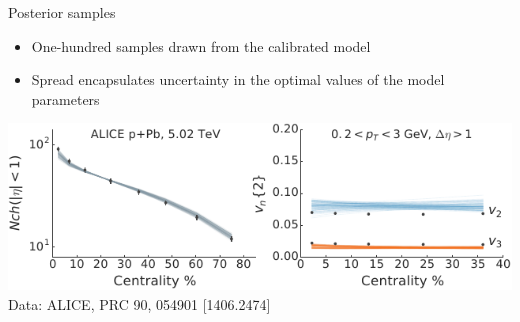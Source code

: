 \documentclass[aspectratio=43]{beamer}
\theoremstyle{definition}
\begin{document}
\begin{frame}[t]{Posterior samples}
  \bigskip
  \begin{itemize}
    \item One-hundred samples drawn from the calibrated model \\[1ex]
    \item Spread encapsulates uncertainty in the optimal values of the model parameters
  \end{itemize}
  \bigskip
  \includegraphics[width=\textwidth]{observables_samples} \\[1ex]
  \centering
  {\scriptsize Data: ALICE, PRC 90, 054901 [1406.2474]}
  \vspace{1.2 cm}
\end{frame}
\end{document}
